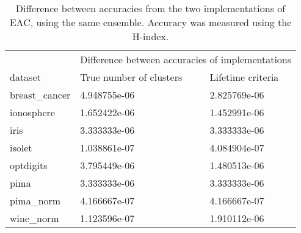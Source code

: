 \begin{table}[h]
\centering
\caption{Difference between accuracies from the two implementations of EAC, using the same ensemble. Accuracy was measured using the H-index.}

\begin{tabular}{lll}
\toprule
         &        \multicolumn{2}{c}{Difference between accuracies of implementations} \\
dataset &      True number of clusters & Lifetime criteria \\
\midrule
breast\_cancer &  4.948755e-06 &      2.825769e-06 \\
ionosphere    &  1.652422e-06 &      1.452991e-06 \\
iris          &  3.333333e-06 &      3.333333e-06 \\
isolet        &  1.038861e-07 &      4.084904e-07 \\
optdigits     &  3.795449e-06 &      1.480513e-06 \\
pima          &  3.333333e-06 &      3.333333e-06 \\
pima\_norm     &  4.166667e-07 &      4.166667e-07 \\
wine\_norm     &  1.123596e-07 &      1.910112e-06 \\
\bottomrule
\end{tabular}

\label{tab:validation error acc}
\end{table}







